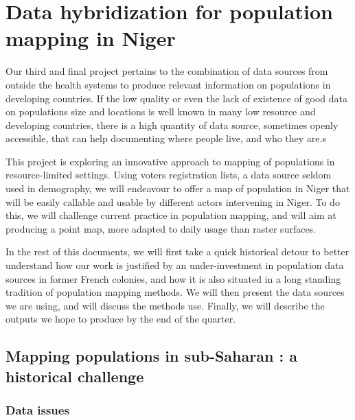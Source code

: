 \section[Using voters list to map population in the Sahel]{Data hybridization for population mapping in Niger}

Our third and final project pertains to the combination of data sources from outside the health systems to produce relevant information on populations in developing countries. If the low quality or even the lack of existence of good data on populations size and locations is well known in many low resource and developing countries, there is a high quantity of data source, sometimes openly accessible, that can help documenting where people live, and who they are.s



This  project is exploring an innovative approach to mapping of populations in resource-limited settings. Using voters registration lists, a data source seldom used in demography, we will endeavour to offer a map of population in Niger that will be easily callable and usable by different actors intervening in Niger. To do this, we will challenge current practice in population mapping, and will aim at producing a point map, more adapted to daily usage than raster surfaces.

In the rest of this documents, we will first take a quick historical detour to better understand how our work is justified by an under-investment in population data sources in former French colonies, and how it is also situated in a long standing tradition of population mapping methods. We will then present the data sources we are using, and will discuss the methods use. Finally, we will describe the outputs we hope to produce by the end of the quarter.


\subsection{Mapping populations in sub-Saharan : a historical challenge}

\subsubsection{Data issues}

